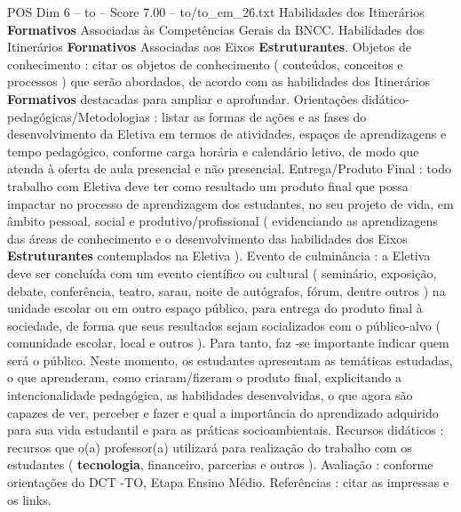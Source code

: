 \begin{textsample}{POS Dim 6 – to – Score 7.00 – to/to\_em\_26.txt}
Habilidades dos Itinerários \textbf{Formativos} Associadas às Competências Gerais da BNCC.
Habilidades dos Itinerários \textbf{Formativos} Associadas aos Eixos \textbf{Estruturantes}.
Objetos de conhecimento : citar os objetos de conhecimento ( conteúdos, conceitos e processos ) que serão abordados, de acordo com as habilidades dos Itinerários \textbf{Formativos} destacadas para ampliar e aprofundar.
Orientações didático-pedagógicas/Metodologias : listar as formas de ações e as fases do desenvolvimento da Eletiva em termos de atividades, espaços de aprendizagens e tempo pedagógico, conforme carga horária e calendário letivo, de modo que atenda à oferta de aula presencial e não presencial.
Entrega/Produto Final : todo trabalho com Eletiva deve ter como resultado um produto final que possa impactar no processo de aprendizagem dos estudantes, no seu projeto de vida, em âmbito pessoal, social e produtivo/profissional ( evidenciando as aprendizagens das áreas de conhecimento e o desenvolvimento das habilidades dos Eixos \textbf{Estruturantes} contemplados na Eletiva ).
Evento de culminância : a Eletiva deve ser concluída com um evento científico ou cultural ( seminário, exposição, debate, conferência, teatro, sarau, noite de autógrafos, fórum, dentre outros ) na unidade escolar ou em outro espaço público, para entrega do produto final à sociedade, de forma que seus resultados sejam socializados com o público-alvo ( comunidade escolar, local e outros ).
Para tanto, faz -se importante indicar quem será o público.
Neste momento, os estudantes apresentam as temáticas estudadas, o que aprenderam, como criaram/fizeram o produto final, explicitando a intencionalidade pedagógica, as habilidades desenvolvidas, o que agora são capazes de ver, perceber e fazer e qual a importância do aprendizado adquirido para sua vida estudantil e para as práticas socioambientais.
Recursos didáticos : recursos que o(a) professor(a) utilizará para realização do trabalho com os estudantes ( \textbf{tecnologia}, financeiro, parcerias e outros ).
Avaliação : conforme orientações do DCT -TO, Etapa Ensino Médio.
Referências : citar as impressas e os links.

\end{textsample}
